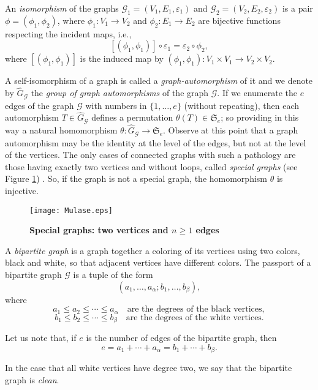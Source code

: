 \documentclass[12pt]{amsart}
\theoremstyle{remark}
\begin{document}
An {\it isomorphism} of the graphs ${\mathcal G}_{1}=(V_{1},E_{1},\varepsilon_{1})$ and ${\mathcal G}_{2}=(V_{2},E_{2},\varepsilon_{2})$ is a pair $\phi=(\phi_{1},\phi_{2})$, where $\phi_{1}:V_{1} \to V_{2}$ and $\phi_{2}:E_{1} \to E_{2}$ are bijective functions respecting the incident maps, i.e., 
$$[(\phi_{1},\phi_{1})] \circ \varepsilon_{1}=\varepsilon_{2} \circ \phi_{2},$$
where $[(\phi_{1},\phi_{1})]$ is the induced map by $(\phi_{1},\phi_{1}):V_{1} \times V_{1} \to V_{2} \times V_{2}$.

A self-isomorphism of a graph is called a {\it graph-automorphism} of it and we denote by $\widehat{G}_{\mathcal G}$ the {\it group of graph automorphisms} of the graph ${\mathcal G}$. If we enumerate the $e$ edges of the graph ${\mathcal G}$ with numbers in $\{1,\ldots,e\}$ (without repeating), then each automorphism $T \in \widehat{G}_{\mathcal G}$ defines a permutation $\theta(T) \in {\mathfrak S}_{e}$; so  providing in this way a natural homomorphism $\theta:\widehat{G}_{\mathcal G} \to {\mathfrak S}_{e}$. Observe at this point that a graph automorphism may be the identity at the level of the edges, but not at the level of the vertices. The only cases of connected graphs with such a pathology are those having exactly two vertices and without loops, called {\it special graphs} (see Figure \ref{Fig:Mulase}) \cite{Mulase}. So, if the graph is not a special graph, the 
homomorphism $\theta$ is injective. 

\begin{figure}[htbp]
\begin{center}
\texttt{[image: Mulase.eps]}
\caption{{\bf Special graphs: two vertices and $n \geq 1$ edges}}
\label{Fig:Mulase}
\end{center}
\end{figure}

 A {\it bipartite graph} is a graph together a coloring of its vertices using two colors, black and white, so that adjacent vertices have different colors. 
The passport of a bipartite graph ${\mathcal G}$ is a tuple of the form 
$$(a_{1},\ldots,a_{\alpha};b_{1},\ldots,b_{\beta}),$$
where $$a_{1} \leq a_{2} \leq \cdots \leq a_{\alpha} \quad \mbox{are the degrees of the black vertices},$$
$$b_{1} \leq b_{2} \leq \cdots \leq b_{\beta} \quad \mbox{are the degrees of the white vertices}.$$

Let us note that, if $e$ is the number of edges of the bipartite graph, then 
$$e=a_{1}+\cdots+a_{\alpha}=b_{1}+\cdots+b_{\beta}.$$

In the case that all white vertices have degree two, we say that the bipartite graph is {\it clean}.
\end{document}
